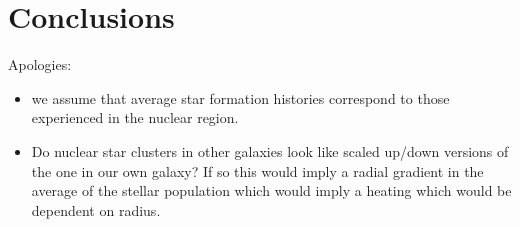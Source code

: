 \documentclass[usenatbib,fleqn]{mn2e}
\newcommand{\Mdot}{\dot{M}}
\newcommand{\eddr}{\dot{M}/\dot{M}_{\rm Edd}}
\newcommand{\rs}{r_s}
\newcommand{\Mbh}[1][]{M_{\bullet#1}}
\newcommand{\rIa}{r_{\rm Ia}}
\newcommand{\vwO}{v_{w}}
\begin{document}



\section{Conclusions}
\label{sec:conclusions}

Apologies: 
\begin{itemize}
\item{we assume that average star formation histories correspond to those experienced in the nuclear region.  }

\item{
Do nuclear star clusters in other galaxies look like scaled up/down versions of the one in our own galaxy? If so this would imply a radial gradient in the average of the stellar population which would imply a heating which would be dependent on radius.
}

\end{itemize}
\end{document}
